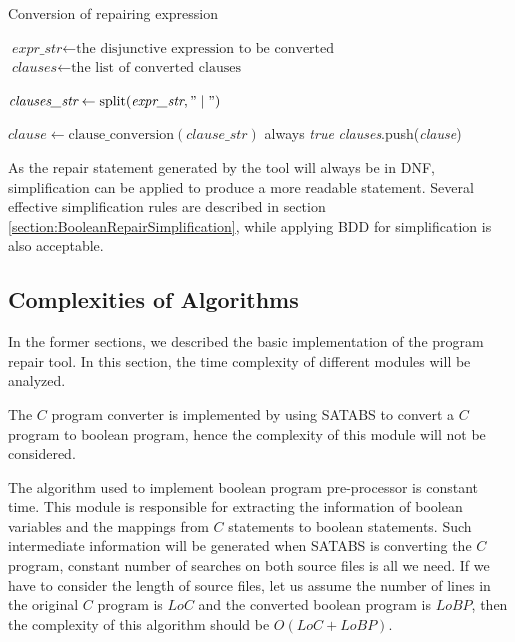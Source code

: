 \begin{algorithm}
\caption{Conversion of repairing expression}
\begin{algorithmic}[1]

\STATE $\textit{expr\_str} \gets \text{the disjunctive expression to be converted}$
\STATE $\textit{clauses} \gets \text{the list of converted clauses}$
\STATE

\STATE $\textit{clauses\_str} \gets \text{split}(\textit{expr\_str}, "\mid")$

  \STATE $\textit{clause} \gets \text{clause\_conversion}(\textit{clause\_str})$
    \RETURN always \textit{true}
  \ENDIF
  \STATE \textit{clauses}.push(\textit{clause})
\ENDFOR

\end{algorithmic}
\end{algorithm}

As the repair statement generated by the tool will always be in DNF, simplification can be applied to produce a more readable statement. Several effective simplification rules are described in section \ref{section:BooleanRepairSimplification}, while applying BDD for simplification is also acceptable.

\subsection{Complexities of Algorithms}
In the former sections, we described the basic implementation of the program repair tool. In this section, the time complexity of different modules will be analyzed.

The $C$ program converter is implemented by using SATABS to convert a $C$ program to boolean program, hence the complexity of this module will not be considered.

The algorithm used to implement boolean program pre-processor is constant time.
This module is responsible for extracting the information of boolean variables and the mappings from $C$ statements to boolean statements.
Such intermediate information will be generated when SATABS is converting the $C$ program, constant number of searches on both source files is all we need.
If we have to consider the length of source files, let us assume the number of lines in the original $C$ program is $LoC$ and the converted boolean program is $LoBP$,
then the complexity of this algorithm should be $O(LoC + LoBP)$.


